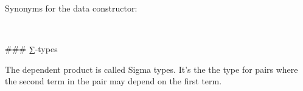 Synonyms for the data constructor:
\begin{code}%
\>[0]\AgdaSpace{}%
\AgdaSpace{}%
\AgdaSymbol{=}\AgdaSpace{}%
\<%
\\
\>[0]\AgdaSpace{}%
%
\>[13]\AgdaSymbol{=}\AgdaSpace{}%
\<%
\end{code}

### ∑-types

The dependent product is called Sigma types. It's the the type for pairs where
the second term in the pair may depend on the first term.

\begin{code}%
\>[0]\<%
\\
\>[0][@{}l@{\AgdaIndent{0}}]%
\>[2]\AgdaSpace{}%
\AgdaSymbol{(}\AgdaSpace{}%
\AgdaSymbol{:}\AgdaSpace{}%
\AgdaSpace{}%
\AgdaSymbol{)(}\AgdaSpace{}%
\AgdaSymbol{:}\AgdaSpace{}%
\AgdaSpace{}%
\AgdaSpace{}%
\AgdaSpace{}%
\AgdaSymbol{)}\<%
\\
\>[2][@{}l@{\AgdaIndent{0}}]%
\>[3]\AgdaSymbol{:}\AgdaSpace{}%
\AgdaSpace{}%
\AgdaSymbol{(}\AgdaSpace{}%
\AgdaSpace{}%
\AgdaSymbol{)}\<%
\\
%
\>[2]\<%
\\
%
\>[2]\AgdaSpace{}%
\AgdaOperator{\AgdaInductiveConstructor{\AgdaUnderscore{},\AgdaUnderscore{}}}\<%
\\
%
\>[2]\<%
\\
\>[2][@{}l@{\AgdaIndent{0}}]%
\>[4]\AgdaSpace{}%
\AgdaSymbol{:}\AgdaSpace{}%
\<%
\\
%
\>[4]\AgdaSpace{}%
\AgdaSymbol{:}\AgdaSpace{}%
\AgdaSpace{}%
\<%
\\
%
\\[\AgdaEmptyExtraSkip]%
\>[0]\AgdaSpace{}%
\AgdaSpace{}%
\AgdaOperator{\AgdaInductiveConstructor{\AgdaUnderscore{},\AgdaUnderscore{}}}\<%
\\
\>[0]\AgdaSpace{}%
\AgdaSpace{}%
\<%
\end{code}

